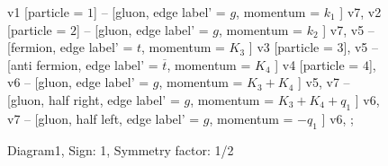 \documentclass{revtex4}
\begin{document}
\begin{figure}[!htb]
\begin{center}
{    %
v1 [particle = \(1\)] -- [gluon, edge label' = \(g\), momentum = \(k_{1}\) ] v7, 
v2 [particle = \(2\)] -- [gluon, edge label' = \(g\), momentum = \(k_{2}\) ] v7, 
v5 -- [fermion, edge label' = \(t\), momentum = \(K_{3}\) ] v3 [particle = \(3\)], 
v5 -- [anti fermion, edge label' = \(\overline{t}\), momentum = \(K_{4}\) ] v4 [particle = \(4\)], 
v6 -- [gluon, edge label' = \(g\), momentum = \(K_{3} + K_{4}\) ] v5, 
v7 -- [gluon, half right, edge label' = \(g\), momentum = \(K_{3} + K_{4} + q_{1}\) ] v6, 
v7 -- [gluon, half left, edge label' = \(g\), momentum = \(-q_{1}\) ] v6, 
};
\end{center}
\caption{Diagram1, Sign: 1, Symmetry factor: 1/2}
\end{figure}
\newpage
\end{document}

